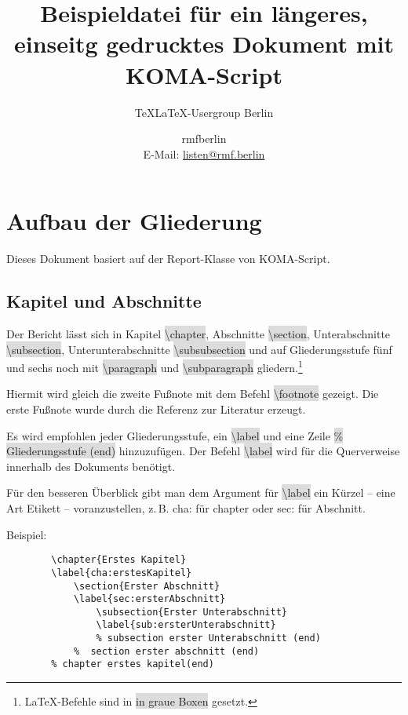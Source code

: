 \documentclass[12pt,	%
				headings=small,		%
				toc=bibliography,	%
			]	%
{scrreprt}		%
\title{Beispieldatei für ein längeres, einseitg gedrucktes Dokument mit KOMA-Script}
\subtitle{TeXLaTeX-Usergroup Berlin}
\author{rmfberlin\\\small{E-Mail: \url{listen@rmf.berlin}}}
\date{\small{\version}}
\newcommand{\inlinecode}[1]{\colorbox{Gainsboro}{\textsf{\textbackslash#1}}} %
\begin{document}
\maketitle
\tableofcontents
\chapter{Aufbau  der Gliederung} %
	\label{cha:aufbauGliederung}
	Dieses Dokument basiert auf der Report-Klasse von KOMA-Script. \cite{komascript:doku}	%
	\section{Kapitel und Abschnitte}
	\label{sec:KapitelAbschnitte}
			Der Bericht lässt sich in Kapitel \inlinecode{chapter}, Abschnitte \inlinecode{section}, Unterabschnitte \inlinecode{subsection}, Unterunterabschnitte \inlinecode{subsubsection} und auf Gliederungsstufe fünf und sechs noch mit \inlinecode{paragraph} und \inlinecode{subparagraph} gliedern.\footnote{\LaTeX-Befehle sind in \colorbox{Gainsboro}{in graue Boxen} gesetzt.} 
			
			Hiermit wird gleich die zweite Fußnote mit dem Befehl \inlinecode{footnote} gezeigt. Die erste Fußnote wurde durch die Referenz zur Literatur erzeugt.
			
			Es wird empfohlen jeder Gliederungsstufe, ein  \inlinecode{label} und eine Zeile \colorbox{Gainsboro}{\textsf{\% Gliederungsstufe (end)}} hinzuzufügen. Der Befehl \inlinecode{label} wird für die Querverweise innerhalb des Dokuments benötigt.\autocite[40]{schlosser:einfuehrung}
			
			Für den besseren Überblick gibt man dem Argument für \inlinecode{label} ein Kürzel -- eine Art Etikett -- voranzustellen, z.\,B. cha: für chapter oder sec: für Abschnitt.\autocite[71]{schlosser:einfuehrung}

	Beispiel:
	
	\begin{lstlisting}
		\chapter{Erstes Kapitel}
		\label{cha:erstesKapitel}
			\section{Erster Abschnitt}
			\label{sec:ersterAbschnitt}
				\subsection{Erster Unterabschnitt}
				\label{sub:ersterUnterabschnitt}
				% subsection erster Unterabschnitt (end)
			%  section erster abschnitt (end)
		% chapter erstes kapitel(end)
	\end{lstlisting}
\end{document}
